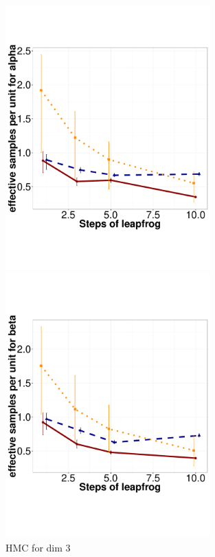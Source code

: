   \begin{figure}[H]
  \centering
  \begin{minipage}[hp]{0.45\linewidth}
  \centering
    \includegraphics [width=0.70\textwidth, angle=0]{figs/h_alpha.pdf}
      \end{minipage}
  \begin{minipage}[hp]{0.45\linewidth}
  \centering
    \includegraphics [width=0.70\textwidth, angle=0]{figs/h_beta.pdf}
      \end{minipage}

    \caption{HMC for dim 3}
  \end{figure}


